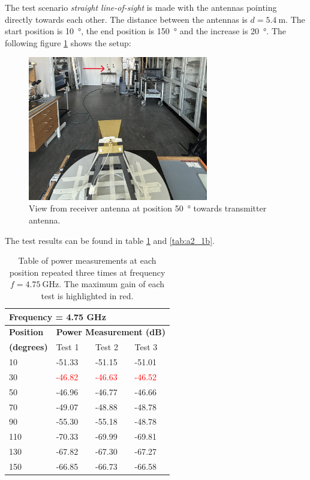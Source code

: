 The test scenario \textit{straight line-of-sight} is made with the antennas pointing directly towards each other. The distance between the antennas is $d=\SI{5.4}{\meter}$. The start position is \SI{10}{\degree}, the end position is \SI{150}{\degree} and the increase is \SI{20}{\degree}. The following figure \ref{fig:a2_1} shows the setup:
\begin{figure}[H]
    \centering
    \includegraphics[width=0.7\textwidth]{figures/test_los_straight.JPG}
    \caption{View from receiver antenna at position \SI{50}{\degree} towards transmitter antenna.} \label{fig:a2_1}
\end{figure}

The test results can be found in table \ref{tab:a2_1a} and \ref{tab:a2_1b}.
\begin{table}[H]
    \centering
    \begin{tabular}{l|l|l|l}
        \multicolumn{4}{l}{\textbf{Frequency = 4.75 GHz}}         \\
        \hline
        \textbf{Position} & \multicolumn{3}{l}{\textbf{Power Measurement (dB)}} \\
        \textbf{(degrees)}  & Test 1    & Test 2  & Test 3  \\
        \hline
        \hline
        10      & -51.33    & -51.15    & -51.01 \\
        30      & \textcolor{red}{-46.82}    & \textcolor{red}{-46.63}    & \textcolor{red}{-46.52} \\
        50      & -46.96    & -46.77    & -46.66 \\
        70      & -49.07    & -48.88    & -48.78 \\
        90      & -55.30    & -55.18    & -48.78 \\
        110     & -70.33    & -69.99    & -69.81 \\
        130     & -67.82    & -67.30    & -67.27 \\
        150     & -66.85    & -66.73    & -66.58
        \end{tabular}
    \caption{Table of power measurements at each position repeated three times at frequency $f=\SI{4.75}{\giga\hertz}$. The maximum gain of each test is highlighted in red.}
    \label{tab:a2_1a}
\end{table}

